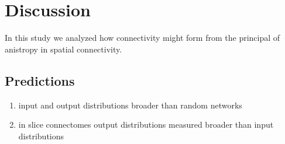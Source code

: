 \clearpage
\pagebreak
\newpage

\section*{Discussion}

In this study we analyzed how connectivity might form from the principal of anistropy in spatial connectivity.





\subsection*{Predictions}

\begin{enumerate}
\item input and output distributions broader than random networks
\item in slice connectomes output distributions measured broader than input distributions
\end{enumerate}
